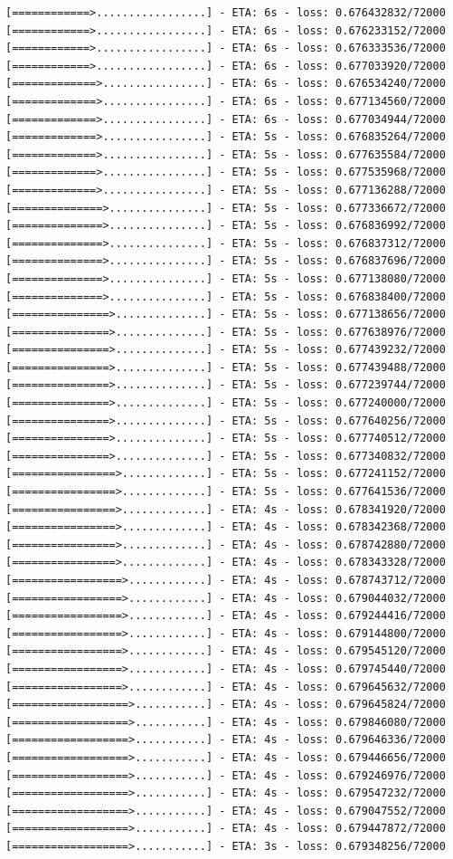 \documentclass[12pt,fleqn]{article}\usepackage{../../common}
\begin{document}
\begin{verbatim}
[============>.................] - ETA: 6s - loss: 0.676432832/72000 [============>.................] - ETA: 6s - loss: 0.676233152/72000 [============>.................] - ETA: 6s - loss: 0.676333536/72000 [============>.................] - ETA: 6s - loss: 0.677033920/72000 [=============>................] - ETA: 6s - loss: 0.676534240/72000 [=============>................] - ETA: 6s - loss: 0.677134560/72000 [=============>................] - ETA: 6s - loss: 0.677034944/72000 [=============>................] - ETA: 5s - loss: 0.676835264/72000 [=============>................] - ETA: 5s - loss: 0.677635584/72000 [=============>................] - ETA: 5s - loss: 0.677535968/72000 [=============>................] - ETA: 5s - loss: 0.677136288/72000 [==============>...............] - ETA: 5s - loss: 0.677336672/72000 [==============>...............] - ETA: 5s - loss: 0.676836992/72000 [==============>...............] - ETA: 5s - loss: 0.676837312/72000 [==============>...............] - ETA: 5s - loss: 0.676837696/72000 [==============>...............] - ETA: 5s - loss: 0.677138080/72000 [==============>...............] - ETA: 5s - loss: 0.676838400/72000 [===============>..............] - ETA: 5s - loss: 0.677138656/72000 [===============>..............] - ETA: 5s - loss: 0.677638976/72000 [===============>..............] - ETA: 5s - loss: 0.677439232/72000 [===============>..............] - ETA: 5s - loss: 0.677439488/72000 [===============>..............] - ETA: 5s - loss: 0.677239744/72000 [===============>..............] - ETA: 5s - loss: 0.677240000/72000 [===============>..............] - ETA: 5s - loss: 0.677640256/72000 [===============>..............] - ETA: 5s - loss: 0.677740512/72000 [===============>..............] - ETA: 5s - loss: 0.677340832/72000 [================>.............] - ETA: 5s - loss: 0.677241152/72000 [================>.............] - ETA: 5s - loss: 0.677641536/72000 [================>.............] - ETA: 4s - loss: 0.678341920/72000 [================>.............] - ETA: 4s - loss: 0.678342368/72000 [================>.............] - ETA: 4s - loss: 0.678742880/72000 [================>.............] - ETA: 4s - loss: 0.678343328/72000 [=================>............] - ETA: 4s - loss: 0.678743712/72000 [=================>............] - ETA: 4s - loss: 0.679044032/72000 [=================>............] - ETA: 4s - loss: 0.679244416/72000 [=================>............] - ETA: 4s - loss: 0.679144800/72000 [=================>............] - ETA: 4s - loss: 0.679545120/72000 [=================>............] - ETA: 4s - loss: 0.679745440/72000 [=================>............] - ETA: 4s - loss: 0.679645632/72000 [==================>...........] - ETA: 4s - loss: 0.679645824/72000 [==================>...........] - ETA: 4s - loss: 0.679846080/72000 [==================>...........] - ETA: 4s - loss: 0.679646336/72000 [==================>...........] - ETA: 4s - loss: 0.679446656/72000 [==================>...........] - ETA: 4s - loss: 0.679246976/72000 [==================>...........] - ETA: 4s - loss: 0.679547232/72000 [==================>...........] - ETA: 4s - loss: 0.679047552/72000 [==================>...........] - ETA: 4s - loss: 0.679447872/72000 [==================>...........] - ETA: 3s - loss: 0.679348256/72000 
\end{verbatim}
\end{document}
